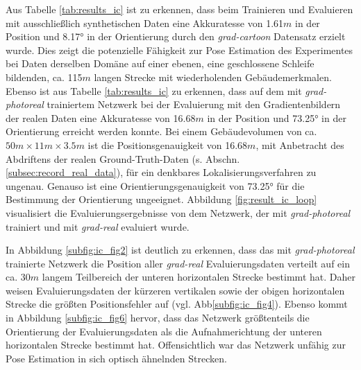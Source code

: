 
Aus Tabelle \ref{tab:results_ic} ist zu erkennen, dass beim Trainieren und Evaluieren mit ausschließlich synthetischen Daten eine Akkuratesse von 1.61$m$ in der Position und 8.17° in der Orientierung  durch den \textit{grad-cartoon} Datensatz erzielt wurde. Dies zeigt die potenzielle Fähigkeit zur Pose Estimation des Experimentes bei Daten derselben Domäne auf einer ebenen, eine geschlossene Schleife bildenden, ca. 115$m$ langen Strecke mit wiederholenden Gebäudemerkmalen. Ebenso ist aus Tabelle \ref{tab:results_ic} zu erkennen, dass auf dem mit \textit{grad-photoreal} trainiertem Netzwerk bei der Evaluierung mit den Gradientenbildern der realen Daten eine Akkuratesse von 16.68$m$ in der Position und 73.25° in der Orientierung erreicht werden konnte. Bei einem Gebäudevolumen von ca. $50m \times 11m \times 3.5m$ ist die Positionsgenauigkeit von 16.68$m$, mit Anbetracht des Abdriftens der realen Ground-Truth-Daten (s. Abschn. \ref{subsec:record_real_data}), für ein denkbares Lokalisierungsverfahren zu ungenau. Genauso ist eine Orientierungsgenauigkeit von 73.25° für die Bestimmung der Orientierung ungeeignet. Abbildung \ref{fig:result_ic_loop} visualisiert die Evaluierungsergebnisse von dem Netzwerk, der mit \textit{grad-photoreal} trainiert und mit \textit{grad-real} evaluiert wurde.

In Abbildung \ref{subfig:ic_fig2} ist deutlich zu erkennen, dass das mit \textit{grad-photoreal} trainierte Netzwerk die Position aller \textit{grad-real} Evaluierungsdaten verteilt auf ein ca. 30$m$ langem Teilbereich der unteren horizontalen Strecke bestimmt hat. Daher weisen Evaluierungsdaten der kürzeren vertikalen sowie der obigen horizontalen Strecke die größten Positionsfehler auf (vgl. Abb\ref{subfig:ic_fig4}). Ebenso kommt in Abbildung \ref{subfig:ic_fig6} hervor, dass das Netzwerk größtenteils die Orientierung der Evaluierungsdaten als die Aufnahmerichtung der unteren horizontalen Strecke bestimmt hat. Offensichtlich war das Netzwerk unfähig zur Pose Estimation in sich optisch ähnelnden Strecken.

